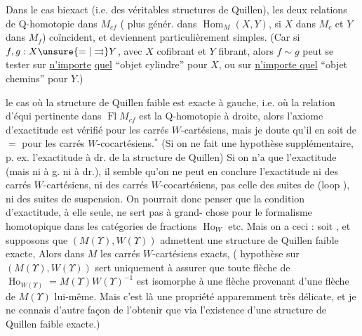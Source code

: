 Dans le cas biexact (i.e.  des véritables structures de Quillen), les deux relations de Q-homotopie dans $M_{cf}$ ( plus génér. dans  $\operatorname{Hom}_{M}(X,Y)$, si $X$ dans $M_{c}$ et $Y$ dans $M_{f}$)
coïncident, et deviennent \inserted{$\unsure{=|\simeq}$} particulièrement simples. (Car si $f,g:X\unsure{=|\rightrightarrows}Y$, avec $X$ cofibrant et $Y$ fibrant, alors $f\sim g$ peut se tester sur \uline{n'importe} \uline{quel} ``objet cylindre'' pour $X$, ou sur \uline{n'importe quel} ``objet chemins'' pour $Y$.)

 le cas où la structure de Quillen faible est exacte à gauche,  i.e. où la relation d'équi pertinente dans $\operatorname{Fl}M_{cf}$ est la Q-homotopie à droite, alors l'axiome d'exactitude est vérifié pour les carrés $W$-cartésiens, mais je doute qu'il en soit de $=$ pour les carrés $W$-cocartésiens.$^{*}$
(Si on ne fait  une hypothèse supplémentaire, p. ex. l'exactitude à dr. de la structure de Quillen) Si on n'a que l'exactitude (mais ni à g. ni à dr.), il semble qu'on ne peut en conclure l'exactitude ni des carrés $W$-cartésiens, ni des carrés $W$-cocartésiens,   pas celle des suites de  (loop ), ni des suites de suspension. On pourrait donc penser que la condition d'exactitude, à elle seule, ne sert pas à grand-
chose pour le formalisme homotopique dans les catégories de fractions $\operatorname{Ho}_{W}$ etc. Mais on a  ceci : soit
, et supposons que   $(M(\Upsilon),W(\Upsilon))$ admettent une structure de Quillen faible exacte,  Alors dans $M$ les carrés $W$-cartésiens  exacts,   ( hypothèse sur $(M(\Upsilon),W(\Upsilon))$ sert uniquement à assurer que toute flèche de $\operatorname{Ho}_{W(\Upsilon)}=M(\Upsilon)W(\Upsilon)^{-1}$ est isomorphe à une flèche provenant d'une flèche de $M(\Upsilon)$ lui-même. \deleted{\unsure{)}} Mais c'est là une propriété apparemment très délicate, et je ne connais d'autre façon de l'obtenir que via l'existence d'une structure de Quillen faible exacte.)
